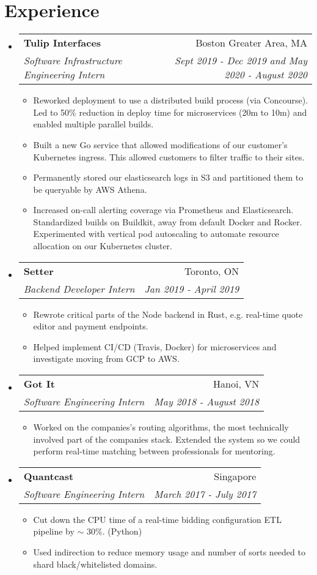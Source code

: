 \documentclass[letterpaper,11pt]{article}
\makeatletter
\newcommand{\resumeSubheading}[4]{
  \vspace{-1pt}\item
    \begin{tabular*}{0.97\textwidth}{l@{\extracolsep{\fill}}r}
      \textbf{#1} & #2 \\
      \textit{\small#3} & \textit{\small #4} \\
    \end{tabular*}\vspace{-5pt}
}
\newcommand{\resumeSubHeadingListStart}{\begin{itemize}[leftmargin=*, label={}]}
\newcommand{\resumeSubHeadingListEnd}{\end{itemize}}
\makeatother
\begin{document}
\section{Experience}
  \resumeSubHeadingListStart
  \resumeSubheading
    {Tulip Interfaces}{Boston Greater Area, MA}
    {Software Infrastructure Engineering Intern}{Sept 2019 - Dec 2019 and May 2020 - August 2020}
        \begin{itemize}[label={\textbullet}]
          \item Reworked deployment to use a distributed build process (via Concourse).
            Led to 50\% reduction in deploy time for microservices (20m to 10m) and enabled multiple parallel builds.
          \item Built a new Go service that allowed modifications of our customer's Kubernetes
            ingress. This allowed customers to filter traffic to their sites.
          \item Permanently stored our elasticsearch logs in S3 and partitioned them to be
            queryable by AWS Athena.
          \item Increased on-call alerting coverage via Prometheus and Elasticsearch.
            Standardized builds on Buildkit, away from default Docker and Rocker.
            Experimented with vertical pod autoscaling to automate resource allocation on our
            Kubernetes cluster.
        \end{itemize}
    \resumeSubheading
      {Setter}{Toronto, ON}
      {Backend Developer Intern}{Jan 2019 - April 2019}
          \begin{itemize}[label={\textbullet}]
              \item Rewrote critical parts of the Node backend in Rust, e.g. real-time quote editor and payment endpoints.
              \item Helped implement CI/CD (Travis, Docker) for microservices and investigate
                  moving from GCP to AWS.
          \end{itemize}
     \resumeSubheading
      {Got It}{Hanoi, VN}
      {Software Engineering Intern}{May 2018 - August 2018}
          \begin{itemize}[label={\textbullet}]
              \item Worked on the companies's routing algorithms, the most
                  technically involved part of the companies stack. Extended the
                  system so we could perform real-time matching between professionals for
                  mentoring.
          \end{itemize}
    \resumeSubheading
      {Quantcast}{Singapore}
      {Software Engineering Intern}{March 2017 - July 2017}
      \begin{itemize}[label={\textbullet}]
        \item Cut down the CPU time of a real-time bidding configuration ETL pipeline by
          \(\sim\) 30\%. (Python)
        \item Used indirection to reduce memory usage and number of sorts
          needed to shard black/whitelisted domains.
      \end{itemize}
  \resumeSubHeadingListEnd
\end{document}
